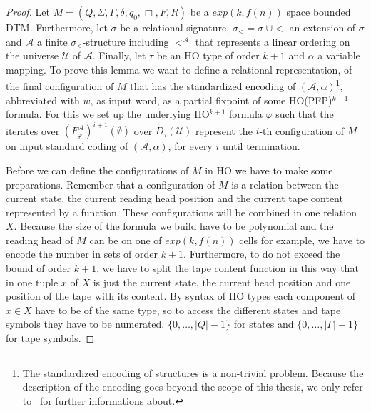 \begin{proof}
    Let $M = (Q, \Sigma, \Gamma, \delta, q_0, \Box, F, R)$ be a $exp(k, f(n))$ space bounded DTM. Furthermore, let $\sigma$ be a relational signature, $\sigma_< = \sigma\;\cup
    <$ an extension of $\sigma$ and $\mathcal{A}$ a finite $\sigma_<$-structure including $<^\mathcal{A}$ that
    represents a linear ordering on the universe $\mathcal{U}$ of $\mathcal{A}$. Finally, let $\tau$ be an HO type of
    order $k + 1$ and $\alpha$ a variable mapping.
    To prove this lemma we want to define a relational representation, of the final configuration of $M$ that has the standardized encoding of $(\mathcal{A}, \alpha)$\footnote{The standardized encoding of structures is a non-trivial problem. Because the description of the encoding goes beyond the scope of this thesis, we only refer to~\cite{abiteboul1995computing} for further informations about.}, abbreviated with $w$, as input word,
    as a partial fixpoint of some HO(PFP)$^{k+1}$ formula. For this we set up the underlying HO$^{k+1}$ formula
    $\varphi$ such that the iterates over $(F_\varphi^\mathcal{A})^{i+1}(\emptyset)$ over $D_\tau
    (\mathcal{U})$ represent the $i$-th configuration of $M$ on input standard coding of $(\mathcal{A}, \alpha)$, for every $i$ until termination.

    Before we can define the configurations of $M$ in HO we have to make some preparations. Remember that a
    configuration of $M$ is a relation between the current state, the current reading head position and
    the current tape content represented by a function. These configurations will be combined in one relation $X$.
    Because the size of the formula we build have to be polynomial and the reading head of $M$ can be on
    one of $exp(k, f(n))$ cells for example, we have to encode the number in sets of order $k + 1$. Furthermore, to do
    not exceed the bound of order $k + 1$, we have to split the tape content function in this way that in one tuple
    $x$ of $X$ is just the current state, the current head position and one position of the tape with its content. By
    syntax of HO types each component of $x \in X$ have to be of the same type, so to access the different states and
    tape symbols they have to be numerated. $\{0, \dots, |Q| - 1\}$ for states and $\{0, \dots, |\Gamma| - 1\}$ for tape
    symbols.


\end{proof}
